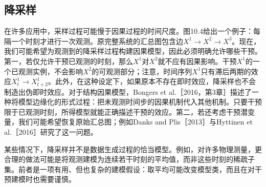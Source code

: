 \subsection{降采样}
在许多应用中，采样过程可能慢于因果过程的时间尺度。图10.4给出一个例子：每隔一个时刻才进行一次观测。原完整系统的汇总图包含边$X^1\to X^2\to X^3$。现在，我们可能希望为观测到的降采样过程构建因果模型，因此必须明确允许哪些干预。第一，若仅允许干预已观测的时刻，那么$X^1$对$X^2$就不应有因果影响。干预$X^1$的一个已观测实例，不会影响$X^2$的可观测部分；注意，时间序列$X^1$只有滞后两期的效应$X_t^1\to X_{t+2}^1$。此外，在这种设定下，如果原本不存在即时效应，降采样也不会制造出伪即时效应。对于结构因果模型，Bongers et al.［2016，第3章］描述了一种将模型边缘化的形式过程：把未观测时间步的因果机制代入其他机制。只要干预限于已观测时刻，所得模型就能正确描述干预的效应。第二，若还考虑干预潜变量，我们可能希望恢复原始汇总图；例如Danks and Plis［2013］与Hyttinen et al.［2016］研究了这一问题。


某些情况下，降采样并不是数据生成过程的恰当模型。例如，对许多物理测量，更合理的做法可能是将观测建模为连续若干时刻的平均值，而非这些时刻的稀疏子集。前者是一项有用、但也复杂的建模假设：取平均可能改变模型类，而且在对干预建模时也需要谨慎。
\FloatBarrier
